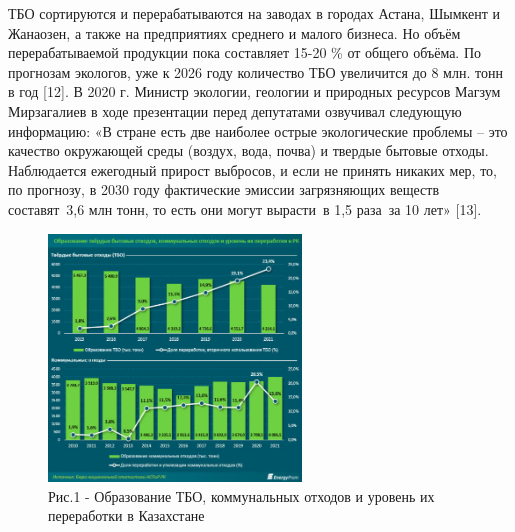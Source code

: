 \begin{multicols}{2}
ТБО сортируются и перерабатываются на заводах в городах Астана, Шымкент
и Жанаозен, а также на предприятиях среднего и малого бизнеса. Но объём
перерабатываемой продукции пока составляет 15-20 \% от общего объёма. По
прогнозам экологов, уже к 2026 году количество ТБО увеличится до 8 млн.
тонн в год {[}12{]}. В 2020 г. Министр экологии, геологии и природных
ресурсов Магзум Мирзагалиев в ходе презентации перед депутатами
озвучивал следующую информацию: «В стране есть две наиболее острые
экологические проблемы -- это качество окружающей среды (воздух, вода,
почва) и твердые бытовые отходы. Наблюдается ежегодный прирост выбросов,
и если не принять никаких мер, то, по прогнозу, в 2030 году фактические
эмиссии загрязняющих веществ составят~3,6 млн тонн, то есть они могут
вырасти~в 1,5 раза~за 10 лет» {[}13{]}.
\end{multicols}

\begin{figure}[H]
	\centering
	\includegraphics[width=0.6\textwidth]{media/chem2/image66}
	\caption*{Рис.1 - Образование ТБО, коммунальных отходов и уровень их переработки в Казахстане}
\end{figure}

